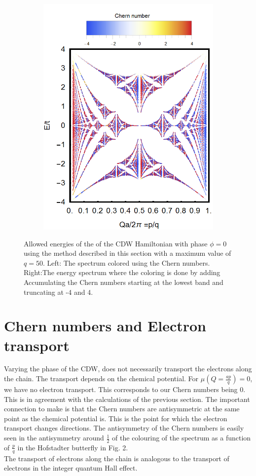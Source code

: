 \documentclass[letterpaper, 10 pt, conference]{ieeeconf}  %
\begin{document}
\begin{figure}[tbph]
\begin{subfigure}{.1\linewidth}
\includegraphics{butterfly50ChernAccuTotal.png}
\label{fig:sub2}
\end{subfigure}
\caption{Allowed energies of the of the CDW Hamiltonian with phase $\phi = 0$ using the method described in this section with a  maximum value of $q = 50$.
Left: The spectrum colored using the Chern numbers.
Right:The energy spectrum where the coloring is done by adding Accumulating the Chern numbers starting at the lowest band and truncating at -4 and 4.}
\end{figure}


\section{Chern numbers and Electron transport}

Varying the phase of the CDW, does not necessarily transport the electrons along the chain.
The transport depends on the chemical potential.
For $\mu(Q=\frac{ap}{q}) = 0$, we have no electron transport.
This corresponds to our Chern numbers being $0$.
This is in agreement with the calculations of the previous section.
The important connection to make is that the Chern numbers are antisymmetric at the same point as the chemical potential is.
This is the point for which the electron transport changes directions.
The antisymmetry of the Chern numbers is easily seen in the antisymmetry around $\frac{1}{2}$ of the colouring of the spectrum as a function of $\frac{p}{q}$ in the Hofstadter butterfly in Fig. 2.\\
The transport of electrons along the chain is analogous to the transport of electrons in the integer quantum Hall effect.
\end{document}
